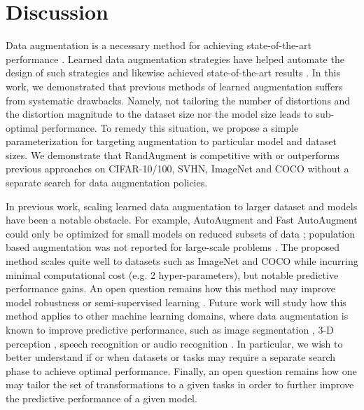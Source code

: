 \section{Discussion}
Data augmentation is a necessary method for achieving state-of-the-art performance \cite{simard2003best,krizhevsky2012imagenet,devries2017dataset,zhang2017mixup,girshick2018detectron,park2019specaugment}. Learned data augmentation strategies have helped automate the design of such strategies and likewise achieved state-of-the-art results \cite{cubuk2018autoaugment,lim2019fast,ho2019population,zoph2019learning}.
In this work, we demonstrated that previous methods of learned augmentation suffers from systematic drawbacks. Namely, not tailoring the number of distortions and the distortion magnitude to the dataset size nor the model size leads to sub-optimal performance.
To remedy this situation, we propose a  simple parameterization for targeting augmentation to particular model and dataset sizes. We demonstrate that RandAugment is competitive with or outperforms previous approaches \cite{cubuk2018autoaugment,lim2019fast,ho2019population,zoph2019learning} on CIFAR-10/100, SVHN, ImageNet and COCO without a separate search for data augmentation policies.

In previous work, scaling learned data augmentation to larger dataset and models have been a notable obstacle. For example, AutoAugment and Fast AutoAugment could only be optimized for small models on reduced subsets of data \cite{cubuk2018autoaugment,lim2019fast}; population based augmentation was not reported for large-scale problems \cite{ho2019population}. The proposed method scales quite well to datasets such as ImageNet and COCO while incurring minimal computational cost (e.g. 2 hyper-parameters), but notable predictive performance gains. An open question remains how this method may improve model robustness \cite{lopes2019improving, yin2019afourier, recht2018cifar} or semi-supervised learning  \cite{xie2019unsupervised}. Future work will study how this method applies to other machine learning domains, where data augmentation is known to improve predictive performance, such as image segmentation \cite{chen2017deeplab}, 3-D perception \cite{ngiam2019starnet}, speech recognition \cite{hinton2012deep} or audio recognition \cite{hershey2017cnn}. In particular, we wish to better understand if or when datasets or tasks may require a separate search phase to achieve optimal performance. Finally, an open question remains how one may tailor the set of transformations to a given tasks in order to further improve the predictive performance of a given model.